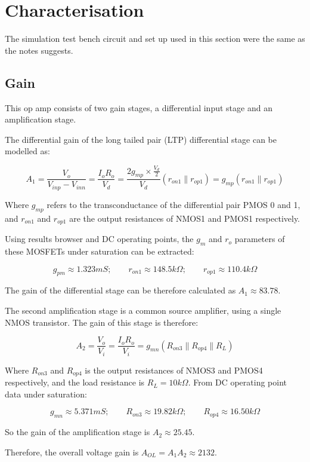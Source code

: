 \section{Characterisation}

The simulation test bench circuit and set up used in this section were the same as the notes suggests.

\subsection{Gain}

This op amp consists of two gain stages, a differential input stage and an amplification stage.

The differential gain of the long tailed pair (LTP) differential stage can be modelled as:

$$
A_1 = \frac{V_o}{V_{inp} - V_{inn}} = \frac{I_o R_o}{V_d}
    = \frac{2 g_{mp} \times \frac{V_d}{2}}{V_d}(r_{on1} \parallel r_{op1})
    = g_{mp} (r_{on1} \parallel r_{op1})
$$

Where $g_{mp}$ refers to the transconductance of the differential pair PMOS 0 and 1, and $r_{on1}$ and $r_{op1}$ are the output resistances of NMOS1 and PMOS1 respectively.

Using results browser and DC operating points, the $g_m$ and $r_{o}$ parameters of these MOSFETs under saturation can be extracted:

$$ g_{pm} \approx 1.323m S; \qquad r_{on1} \approx 148.5k \Omega; \qquad r_{op1} \approx 110.4k \Omega $$

The gain of the differential stage can be therefore calculated as $A_1 \approx 83.78$.

The second amplification stage is a common source amplifier, using a single NMOS transistor. The gain of this stage is therefore:

$$ A_2 = \frac{V_o}{V_i} = \frac{I_o R_o}{V_i} = g_{mn} (R_{on3} \parallel R_{op4} \parallel R_L) $$

Where $R_{on3}$ and $R_{op4}$ is the output resistances of NMOS3 and PMOS4 respectively, and the load resistance is $R_L = 10k \Omega$. From DC operating point data under saturation:

$$ g_{mn} \approx 5.371m S; \qquad R_{on3} \approx 19.82k \Omega; \qquad R_{op4} \approx 16.50k \Omega $$

So the gain of the amplification stage is $A_2 \approx 25.45$.

Therefore, the overall voltage gain is $A_{OL} = A_1 A_2 \approx 2132$.

